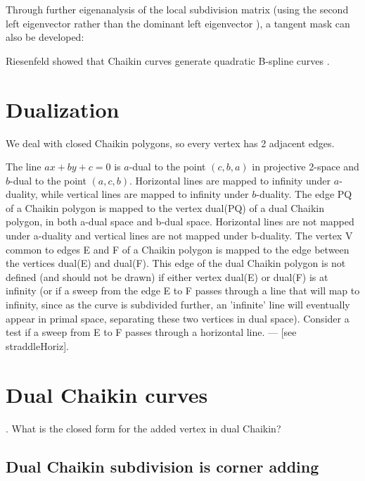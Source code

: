 \documentclass[12pt]{article}
\begin{document}
Through further eigenanalysis of the local subdivision matrix (using the second
left eigenvector rather than the dominant left eigenvector \cite{halstead93}),
a tangent mask can also be developed:
\[
\]


Riesenfeld showed that Chaikin curves generate quadratic B-spline curves 
\cite{riesenfeld75}.

\clearpage


\section{Dualization}

We deal with closed Chaikin polygons, so every vertex has 2 adjacent edges.

The line $ax+by+c=0$ is $a$-dual to the point $(c,b,a)$ in projective 2-space
and $b$-dual to the point $(a,c,b)$.
Horizontal lines are mapped to infinity under $a$-duality,
while vertical lines are mapped to infinity under $b$-duality.
The edge PQ of a Chaikin polygon is mapped to the vertex dual(PQ) of a dual Chaikin polygon,
in both a-dual space and b-dual space.
Horizontal lines are not mapped under a-duality and
vertical lines are not mapped under b-duality.
The vertex V common to edges E and F of a Chaikin polygon is mapped to the edge between
the vertices dual(E) and dual(F).
This edge of the dual Chaikin polygon is not defined (and should not be drawn)
if either vertex dual(E) or dual(F) is at infinity
(or if a sweep from the edge E to F passes through a line that will map to infinity,
since as the curve is subdivided further, an 'infinite' line will eventually appear in primal space,
separating these two vertices in dual space).
Consider a test if a sweep from E to F passes through a horizontal line.
--- [see straddleHoriz].

\section{Dual Chaikin curves}
\label{sec:dualchai}

\cite{sabin87,dyn92,levin00}.
What is the closed form for the added vertex in dual Chaikin?


\subsection{Dual Chaikin subdivision is corner adding}
\end{document}

